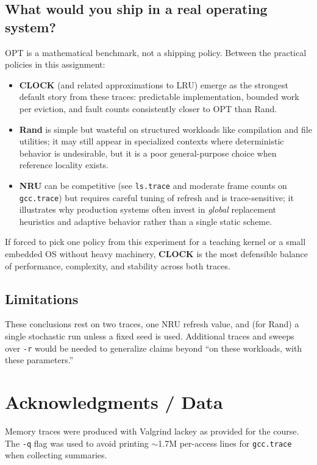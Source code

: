 \documentclass[11pt]{article}
\begin{document}
\subsection{What would you ship in a real operating system?}

OPT is a mathematical benchmark, not a shipping policy. Between the practical policies in this assignment:

\begin{itemize}
  \item \textbf{CLOCK} (and related approximations to LRU) emerge as the strongest default story from these traces: predictable implementation, bounded work per eviction, and fault counts consistently closer to OPT than Rand.
  \item \textbf{Rand} is simple but wasteful on structured workloads like compilation and file utilities; it may still appear in specialized contexts where deterministic behavior is undesirable, but it is a poor general-purpose choice when reference locality exists.
  \item \textbf{NRU} can be competitive (see \texttt{ls.trace} and moderate frame counts on \texttt{gcc.trace}) but requires careful tuning of refresh and is trace-sensitive; it illustrates why production systems often invest in \emph{global} replacement heuristics and adaptive behavior rather than a single static scheme.
\end{itemize}

If forced to pick one policy from this experiment for a teaching kernel or a small embedded OS without heavy machinery, \textbf{CLOCK} is the most defensible balance of performance, complexity, and stability across both traces.

\subsection{Limitations}

These conclusions rest on two traces, one NRU refresh value, and (for Rand) a single stochastic run unless a fixed seed is used. Additional traces and sweeps over \texttt{-r} would be needed to generalize claims beyond ``on these workloads, with these parameters.''

\section*{Acknowledgments / Data}

Memory traces were produced with Valgrind lackey as provided for the course. The \texttt{-q} flag was used to avoid printing $\sim$\num{1.7}M per-access lines for \texttt{gcc.trace} when collecting summaries.
\end{document}
